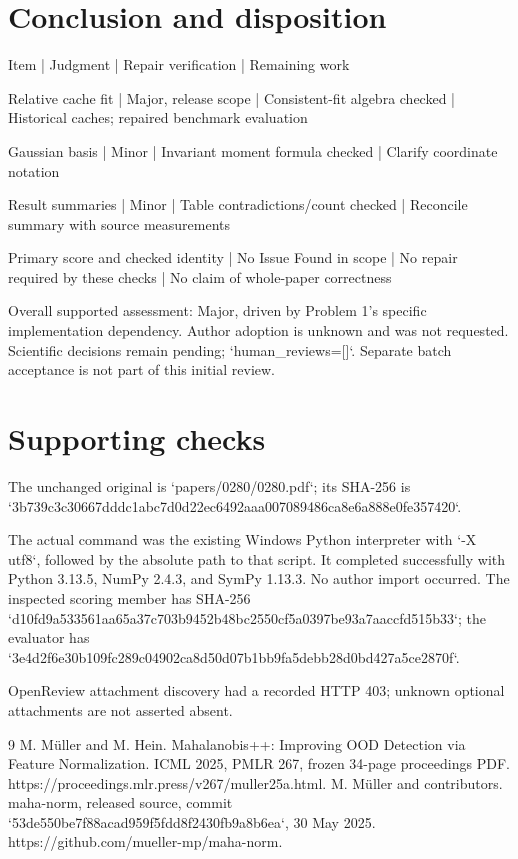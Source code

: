 \documentclass[10pt]{article}
\begin{document}
\section*{Conclusion and disposition}
Item | Judgment | Repair verification | Remaining work\par
Relative cache fit | Major, release scope | Consistent-fit algebra checked | Historical caches; repaired benchmark evaluation\par
Gaussian basis | Minor | Invariant moment formula checked | Clarify coordinate notation\par
Result summaries | Minor | Table contradictions/count checked | Reconcile summary with source measurements\par
Primary score and checked identity | No Issue Found in scope | No repair required by these checks | No claim of whole-paper correctness\par
Overall supported assessment: Major, driven by Problem 1’s specific implementation dependency. Author adoption is unknown and was not requested. Scientific decisions remain pending; `human\_reviews=[]`. Separate batch acceptance is not part of this initial review.\par
\section*{Supporting checks}
The unchanged original is `papers/0280/0280.pdf`; its SHA-256 is `3b739c3c30667dddc1abc7d0d22ec6492aaa007089486ca8e6a888e0fe357420`.\par
The actual command was the existing Windows Python interpreter with `-X utf8`, followed by the absolute path to that script. It completed successfully with Python 3.13.5, NumPy 2.4.3, and SymPy 1.13.3. No author import occurred. The inspected scoring member has SHA-256 `d10fd9a533561aa65a37c703b9452b48bc2550cf5a0397be93a7aaccfd515b33`; the evaluator has `3e4d2f6e30b109fc289c04902ca8d50d07b1bb9fa5debb28d0bd427a5ce2870f`.\par
OpenReview attachment discovery had a recorded HTTP 403; unknown optional attachments are not asserted absent.\par
9 M. Müller and M. Hein. Mahalanobis++: Improving OOD Detection via Feature Normalization. ICML 2025, PMLR 267, frozen 34-page proceedings PDF. https://proceedings.mlr.press/v267/muller25a.html. M. Müller and contributors. maha-norm, released source, commit `53de550be7f88acad959f5fdd8f2430fb9a8b6ea`, 30 May 2025. https://github.com/mueller-mp/maha-norm.\par
\end{document}
